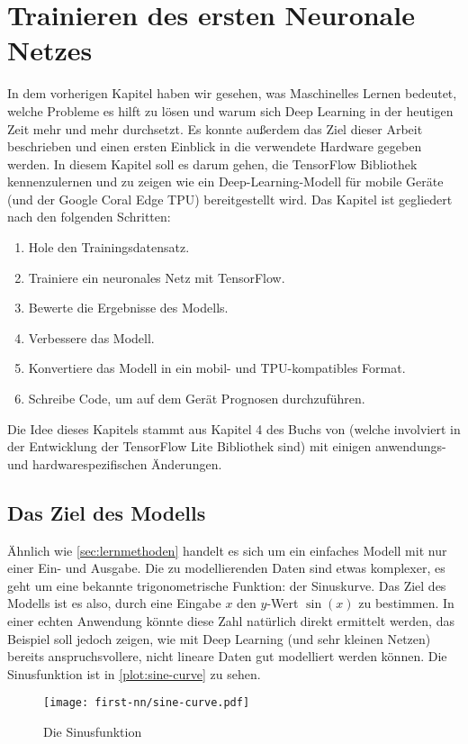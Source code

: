 \chapter{Trainieren des ersten Neuronale Netzes}
In dem vorherigen Kapitel haben wir gesehen,
was Maschinelles Lernen bedeutet, welche
Probleme es hilft zu lösen und warum sich
Deep Learning in der heutigen Zeit mehr und mehr durchsetzt.
Es konnte außerdem das Ziel dieser Arbeit
beschrieben und einen ersten Einblick
in die verwendete Hardware gegeben werden.
In diesem Kapitel soll es darum gehen, die
TensorFlow Bibliothek kennenzulernen
und zu zeigen wie ein Deep-Learning-Modell
für mobile Geräte (und der Google Coral Edge TPU) bereitgestellt wird.
Das Kapitel ist gegliedert nach den folgenden Schritten:
\begin{enumerate}
  \item Hole den Trainingsdatensatz.
  \item Trainiere ein neuronales Netz mit TensorFlow.
  \item Bewerte die Ergebnisse des Modells.
  \item Verbessere das Modell.
  \item Konvertiere das Modell in ein mobil- und TPU-kompatibles Format.
  \item Schreibe Code, um auf dem Gerät Prognosen durchzuführen.
\end{enumerate}
Die Idee dieses Kapitels stammt aus Kapitel 4 des Buchs 
von \textcite{book:tiny-ml} (welche involviert in der Entwicklung
der TensorFlow Lite Bibliothek sind) mit einigen
anwendungs- und hardwarespezifischen Änderungen.

\section{Das Ziel des Modells}
Ähnlich wie \autoref{sec:lernmethoden} handelt es sich
um ein einfaches Modell mit nur einer Ein- und Ausgabe.
Die zu modellierenden Daten sind etwas komplexer,
es geht um eine bekannte trigonometrische Funktion: der Sinuskurve.
Das Ziel des Modells ist es also, durch eine Eingabe $x$
den $y$-Wert $\sin(x)$ zu bestimmen.
In einer echten Anwendung könnte
diese Zahl natürlich direkt ermittelt werden,
das Beispiel soll jedoch zeigen,
wie mit Deep Learning (und sehr kleinen Netzen)
bereits anspruchsvollere, nicht lineare Daten gut modelliert werden können.
Die Sinusfunktion ist in \autoref{plot:sine-curve} zu sehen.
\begin{figure}[h!]
  \centering
  \texttt{[image: first-nn/sine-curve.pdf]}
  \caption{Die Sinusfunktion}
  \label{plot:sine-curve}
\end{figure}

